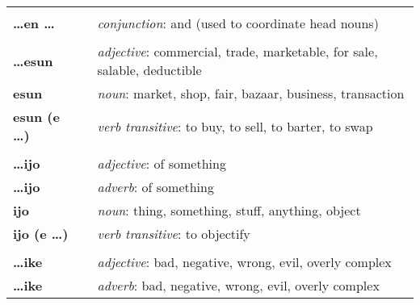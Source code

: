 \begin{supertabular}{p{2,5cm}|ll}
                                 &  &                                                                                                            \\ %
    \textbf{\dots en \dots}      &  & \textit{conjunction}: and (used to coordinate head nouns)                                                  \\
                                 &  &                                                                                                            \\ %
    \textbf{\dots esun}          &  & \textit{adjective}: commercial, trade, marketable, for sale, salable, deductible                           \\
    \textbf{esun}                &  & \textit{noun}: market, shop, fair, bazaar, business, transaction                                           \\
    \textbf{esun (e \dots)}      &  & \textit{verb transitive}: to buy, to sell, to barter, to swap                                              \\
                                 &  &                                                                                                            \\ %
    \textbf{\dots ijo}           &  & \textit{adjective}: of something                                                                           \\
    \textbf{\dots ijo}           &  & \textit{adverb}: of something                                                                              \\
    \textbf{ijo}                 &  & \textit{noun}: thing, something, stuff, anything, object                                                   \\
    \textbf{ijo (e \dots)}       &  & \textit{verb transitive}: to objectify                                                                     \\
                                 &  &                                                                                                            \\ %
    \textbf{\dots ike}           &  & \textit{adjective}: bad, negative, wrong, evil, overly complex                                             \\
    \textbf{\dots ike}           &  & \textit{adverb}: bad, negative, wrong, evil, overly complex                                                \\

\end{supertabular}
